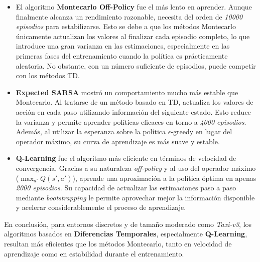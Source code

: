 \begin{itemize}

\item El algoritmo \textbf{Montecarlo Off-Policy} fue el más lento en aprender.
Aunque finalmente alcanza un rendimiento razonable, necesita del orden de \textit{10000 episodios}
para estabilizarse. Esto se debe a que los métodos Montecarlo únicamente actualizan los valores
al finalizar cada episodio completo, lo que introduce una gran varianza en las estimaciones,
especialmente en las primeras fases del entrenamiento cuando la política es prácticamente aleatoria. No obstante, con un número suficiente de episodios, puede competir con los métodos TD.

\item \textbf{Expected SARSA} mostró un comportamiento mucho más estable que Montecarlo.
Al tratarse de un método basado en TD, actualiza los valores
de acción en cada paso utilizando información del siguiente estado. Esto reduce la varianza
y permite aprender políticas eficaces en torno a \textit{4000 episodios}. Además, al utilizar
la esperanza sobre la política $\epsilon$-greedy en lugar del operador máximo, su curva de
aprendizaje es más suave y estable.

\item \textbf{Q-Learning} fue el algoritmo más eficiente en términos de velocidad de convergencia.
Gracias a su naturaleza \textit{off-policy} y al uso del operador máximo
($\max_{a'} Q(s',a')$), aprende una aproximación a la política óptima en apenas
\textit{2000 episodios}. Su capacidad de actualizar las estimaciones paso a paso mediante
\textit{bootstrapping} le permite aprovechar mejor la información disponible y acelerar
considerablemente el proceso de aprendizaje.


\end{itemize}

En conclusión, para entornos discretos y de tamaño moderado como \textit{Taxi-v3},
los algoritmos basados en \textbf{Diferencias Temporales}, especialmente \textbf{Q-Learning},
resultan más eficientes que los métodos Montecarlo, tanto en velocidad de aprendizaje
como en estabilidad durante el entrenamiento.

